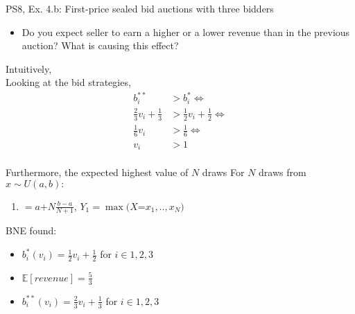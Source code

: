 \begin{frame}{PS8, Ex. 4.b: First-price sealed bid auctions with three bidders}
    \begin{itemize}
      \item[(b)] Do you expect seller to earn a higher or a lower revenue than in the previous auction? What is causing this effect?
    \end{itemize}
    \vspace{-8pt}
    \begin{multicols}{2}
    Intuitively, \\\smallskip
    Looking at the bid strategies,  \vspace{-2pt}
    \begin{align*}
      b_i^{**}&>b_i^{*}\Leftrightarrow\\
      \frac{2}{3}v_i+\frac{1}{3}&>\frac{1}{2}v_i+\frac{1}{2}\Leftrightarrow\\
      \frac{1}{6}v_i&>\frac{1}{6}\Leftrightarrow\\
                 v_i&>1
    \end{align*}
    \\\smallskip
    Furthermore, the expected highest value of $N$ draws 
    \vfill\null\columnbreak
    For $N$ draws from $x\sim U(a, b):$
    \vspace{-6pt}
    \begin{enumerate}
      \item[$\mathbb{E}(Y_1)$] $=a$+$N\frac{b-a}{N+1}$, $Y_1=\max(X$=$x_1,..,x_N)$
    \end{enumerate}
    \vspace{-6pt}
    BNE found:
    \begin{itemize}
      \item[(3.a)] $b_i^{*}(v_i)=\frac{1}{2}v_i+\frac{1}{2}$ for $i\in1,2,3$
      \item[(3.b)] $\mathbb{E}[revenue]=\frac{5}{3}$
      \item[(4.a)] $b_i^{**}(v_i)=\frac{2}{3}v_i+\frac{1}{3}$ for $i\in1,2,3$
    \end{itemize}
    \vfill\null
    \end{multicols}
\end{frame}


